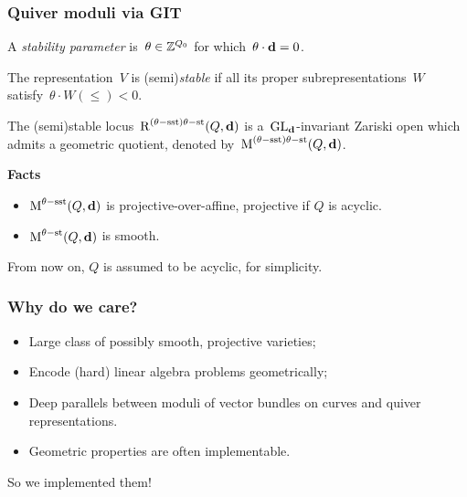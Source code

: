 \documentclass{beamer}
\begin{document}
\begin{frame}
    \frametitle{Quiver moduli via GIT}
A \emph{stability parameter} is~$\theta \in \mathbb{Z}^{Q_0}$
for which~$\theta \cdot \mathbf{d} = 0$. \pause
\begin{definition}
The representation~$V$ is (semi)\emph{stable}
if all its proper subrepresentations~$W$ satisfy~$\theta \cdot W (\leq)< 0$.
\end{definition} \pause
\begin{theorem}
The (semi)stable locus~$\operatorname{R}^{(\theta-\mathrm{sst})\theta-\mathrm{st}}(Q, \mathbf{d})$
is a~$\operatorname{GL}_{\mathbf{d}}$-invariant Zariski open which admits a geometric quotient,
denoted by~$\operatorname{M}^{(\theta-\mathrm{sst})\theta-\mathrm{st}}(Q, \mathbf{d})$.
\end{theorem} \pause
\textbf{Facts} \pause

\begin{itemize}
    \item $\operatorname{M}^{\theta-\mathrm{sst}}(Q, \mathbf{d})$ is projective-over-affine,
    projective if $Q$ is acyclic.
    \item $\operatorname{M}^{\theta-\mathrm{st}}(Q, \mathbf{d})$ is smooth.
\end{itemize} \pause
From now on, $Q$ is assumed to be acyclic, for simplicity.
\end{frame}

\begin{frame}
    \frametitle{Why do we care?}
\begin{itemize}
    \item Large class of possibly smooth, projective varieties; \pause
    \item Encode (hard) linear algebra problems geometrically; \pause
    \item Deep parallels between moduli of vector bundles on curves
        and quiver representations. \pause
    \item Geometric properties are often implementable.
\end{itemize} \pause
\vfill
\begin{center}
    So we implemented them!
\end{center}
    

\end{frame}
\end{document}
